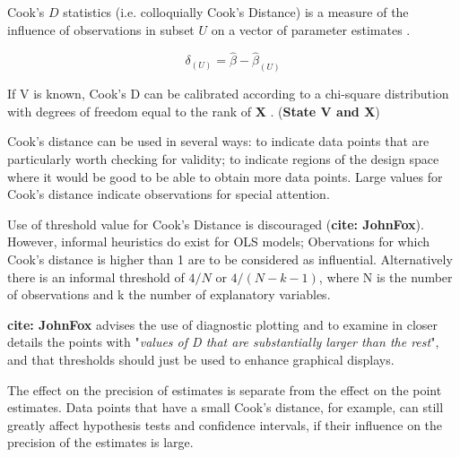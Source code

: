 \documentclass[12pt, a4paper]{report}
\theoremstyle{plain}
\theoremstyle{definition}
\theoremstyle{remark}
\begin{document}
 Cook's $D$ statistics (i.e. colloquially Cook's Distance) is a measure of the influence of observations in subset $U$ on a vector of parameter estimates \citep{cook77}.

\[ \delta_{(U)} = \hat{\beta} - \hat{\beta}_{(U)}\]

If V is known, Cook's D can be calibrated according to a chi-square distribution with degrees of freedom equal to the rank of $\boldsymbol{X}$ \citep{cpj92}. (\textbf{State V and X})


Cook's distance can be used in several ways: to indicate data points that are particularly worth checking for validity; to indicate regions of the design space where it would be good to be able to obtain more data points. 
Large values for Cook's distance indicate observations for special attention. 

Use of threshold value for Cook's Distance is discouraged (\textbf{cite: JohnFox}). However, informal heuristics do exist for OLS models; Obervations for which Cook's distance is higher than 1 are to be considered as influential. Alternatively there is an informal threshold of $4/N$ or $4/(N−k−1)$, where N is the number of observations and k the number of explanatory variables.



\textbf{cite: JohnFox} advises the use of diagnostic plotting and to examine in closer details the points with "\textit{values of D that are substantially larger than the rest}", and that thresholds should just be used to enhance graphical displays.


The effect on the precision of estimates is separate from the effect on the point estimates. Data points that have a small Cook's distance, for example, can still greatly affect hypothesis tests and confidence intervals, if their  influence on the precision of the estimates is large.
\end{document}
